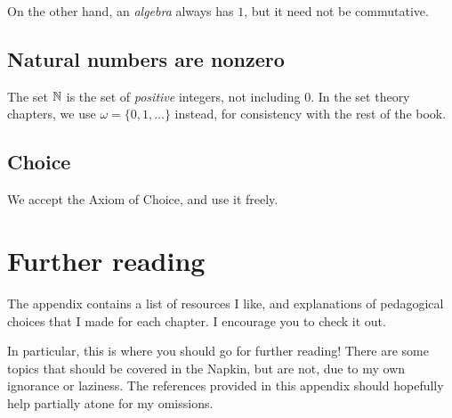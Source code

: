 On the other hand, an \emph{algebra} always has $1$,
but it need not be commutative.

\subsection*{Natural numbers are nonzero}
The set $\mathbb N$ is the set of \emph{positive} integers, not including $0$.
In the set theory chapters, we use $\omega = \{0, 1, \dots\}$
instead, for consistency with the rest of the book.

\subsection*{Choice}
We accept the Axiom of Choice, and use it freely.

\section{Further reading}
The appendix  contains a list of resources I like,
and explanations of pedagogical choices that I made for each chapter.
I encourage you to check it out.

In particular, this is where you should go for further reading!
There are some topics that should be covered in the Napkin,
but are not, due to my own ignorance or laziness.
The references provided in this appendix should hopefully help partially
atone for my omissions.
